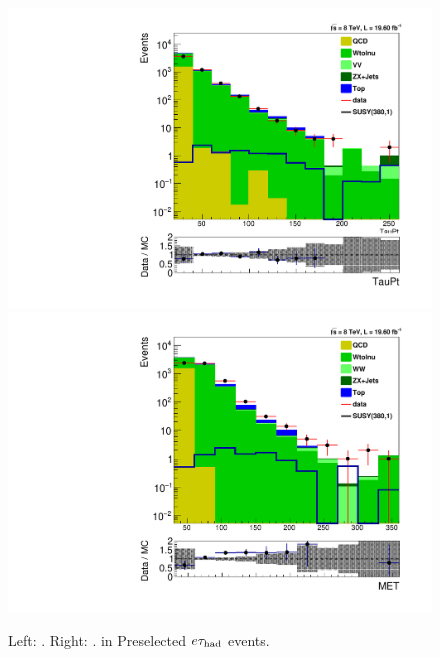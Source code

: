 \begin{figure}[htbp]
\centering
\includegraphics[angle=0,scale=0.35]{SelectionEleTau/TauPt.pdf}
\includegraphics[angle=0,scale=0.35]{SelectionEleTau/MET.pdf}
\caption{Left: \Tau\PT. Right: \MET. in Preselected $e\tau_{\rm had}$ events.}
\label{fig:datamceletau}
\end{figure}

